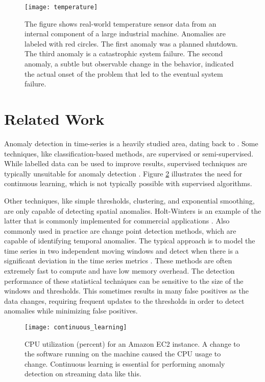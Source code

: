 \documentclass{article}
\begin{document}
\begin{figure}[ht]
\vskip 0.2in
\begin{center}
\centerline{\texttt{[image: temperature]}}
\caption{The figure shows real-world temperature sensor data from an internal
component of a large industrial machine. Anomalies are labeled with red circles.
The first anomaly was a planned shutdown. The third anomaly is a catastrophic
system failure. The second anomaly, a subtle but observable change in the
behavior, indicated the actual onset of the problem that led to the eventual
system failure.}
\label{icml-historical}
\end{center}
\vskip -0.2in
\end{figure}

\section{Related Work}

Anomaly detection in time-series is a heavily studied area, dating back to
\cite{Fox1972}. Some techniques, like classification-based methods, are
supervised or semi-supervised. While labelled data can be used to improve
results, supervised techniques are typically unsuitable for anomaly detection
\cite{Gornitz2013}. Figure \ref{continuous-learning} illustrates the need for
continuous learning, which is not typically possible with supervised
algorithms.

Other techniques, like simple thresholds, clustering, and exponential smoothing,
are only capable of detecting spatial anomalies. Holt-Winters is an example of
the latter that is commonly implemented for commercial applications
\cite{Szmit2012}. Also commonly used in practice are change point detection
methods, which are capable of identifying temporal anomalies. The typical
approach is to model the time series in two independent moving windows and
detect when there is a significant deviation in the time series metrics
\cite{Basseville1993}. These methods are often extremely fast to compute and
have low memory overhead. The detection performance of these statistical
techniques can be sensitive to the size of the windows and thresholds. This
sometimes results in many false positives as the data changes, requiring
frequent updates to the thresholds in order to detect anomalies while minimizing
false positives.

\begin{figure}[ht]
\vskip 0.2in
\begin{center}
\centerline{\texttt{[image: continuous\_learning]}}
\caption{CPU utilization (percent) for an Amazon EC2 instance. A change to the
software running on the machine caused the CPU usage to change. Continuous
learning is essential for performing anomaly detection on streaming data like
this.}
\label{continuous-learning}
\end{center}
\vskip -0.2in
\end{figure}
\end{document}
